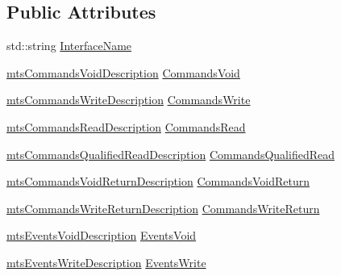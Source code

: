 \subsection*{Public Attributes}
\begin{DoxyCompactItemize}
\item 
std\-::string \hyperlink{classmts_interface_provided_description_a9d0b2061eb25931296b5d0b55b7147c0}{Interface\-Name}
\item 
\hyperlink{mts_interface_common_8h_a9aa601d6e65ef66e89806322ec4444ef}{mts\-Commands\-Void\-Description} \hyperlink{classmts_interface_provided_description_a3af9f3fa7e9c6acfce83fe652f9deffa}{Commands\-Void}
\item 
\hyperlink{mts_interface_common_8h_a0bcc3117036745a1e4da8fae37f9b3c2}{mts\-Commands\-Write\-Description} \hyperlink{classmts_interface_provided_description_a15be8bbb0b0c98fccae2bfb6a5424b94}{Commands\-Write}
\item 
\hyperlink{mts_interface_common_8h_a9e1511dfac508d23f474b42d08382987}{mts\-Commands\-Read\-Description} \hyperlink{classmts_interface_provided_description_a19c757b72b3b5dc1a91a7eb23cc2c0d7}{Commands\-Read}
\item 
\hyperlink{mts_interface_common_8h_ab70cb9469a75500c92633f16484bc699}{mts\-Commands\-Qualified\-Read\-Description} \hyperlink{classmts_interface_provided_description_a2553b42f30fe184eec7acbeeb0a42935}{Commands\-Qualified\-Read}
\item 
\hyperlink{mts_interface_common_8h_aec46641a384fd3d81c85ccce0e695c7d}{mts\-Commands\-Void\-Return\-Description} \hyperlink{classmts_interface_provided_description_ad0d205969cd06a1727814fac28eb1e9e}{Commands\-Void\-Return}
\item 
\hyperlink{mts_interface_common_8h_a2e1cd4e627518e43c1535b092e438ed0}{mts\-Commands\-Write\-Return\-Description} \hyperlink{classmts_interface_provided_description_aa9e3fc49bd7f8e1a156d29c951a534e7}{Commands\-Write\-Return}
\item 
\hyperlink{mts_interface_common_8h_a7aa44fd65d9bb6ddc7ee54f73763e091}{mts\-Events\-Void\-Description} \hyperlink{classmts_interface_provided_description_ab929da8fee6a684c4bea9d4de67fd214}{Events\-Void}
\item 
\hyperlink{mts_interface_common_8h_a0c9128c0dbc726c86555f331aa692ebc}{mts\-Events\-Write\-Description} \hyperlink{classmts_interface_provided_description_a676740e1b5728c67c10a76ac588d39aa}{Events\-Write}
\end{DoxyCompactItemize}


